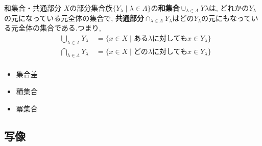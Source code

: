 \documentclass[dvipdfmx,b4j]{jsarticle}
\begin{document}
\subsubsection{}
\begin{definition}{和集合・共通部分}{}
$X$の部分集合族$\{Y_\lambda\mid\lambda\in\Lambda\}$の\textbf{和集合}$\cup_{\lambda\in\Lambda}Y\lambda$は,
どれかの$Y_\lambda$の元になっている元全体の集合で,
\textbf{共通部分}$\cap_{\lambda\in\Lambda}Y_\lambda$はどの$Y_\lambda$の元にもなっている元全体の集合である.つまり,
\begin{align*}
&\bigcup_{\lambda\in\Lambda}Y_\lambda\quad=\{x\in X\mid \text{ある}\lambda\text{に対しても}x\in Y_\lambda\}\\
&\bigcap_{\lambda\in\Lambda}Y_\lambda\quad=\{x\in X\mid \text{どの}\lambda\text{に対しても}x\in Y_\lambda\}\\
\end{align*}

\end{definition}
\begin{itemize}
\item 集合差
\item 積集合
\item 冪集合
\end{itemize}
\subsection{写像}
\end{document}
